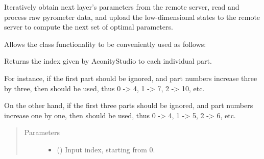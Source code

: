 \documentclass[letterpaper,10pt,english,openany,oneside]{sphinxmanual}
\begin{document}
\begin{fulllineitems}
\begin{fulllineitems}
\end{fulllineitems}


\begin{fulllineitems}
\label{\detokenize{_modules/machine:machine.Machine.log}}
\end{fulllineitems}


\begin{fulllineitems}
\label{\detokenize{_modules/machine:machine.Machine.loop}}
Iteratively obtain next layer’s parameters from the remote server,
read and process raw pyrometer data, and upload the low-dimensional
states to the remote server to compute the next set of optimal parameters.

Allows the class functionality to be conveniently used as follows:

\begin{sphinxVerbatim}[commandchars=\\\{\}]
   
\end{sphinxVerbatim}

\end{fulllineitems}


\begin{fulllineitems}
\label{\detokenize{_modules/machine:machine.Machine.pieceNumber}}
Returns the index given by AconityStudio to each individual part.

For instance, if the first part should be ignored, and part numbers increase
three by three, then  should be used, thus
0 -\textgreater{} 4, 1 -\textgreater{} 7, 2 -\textgreater{} 10, etc.

On the other hand, if the first three parts should be ignored, and part numbers
increase one by one, then  should be used, thus
0 -\textgreater{} 4, 1 -\textgreater{} 5, 2 -\textgreater{} 6, etc.
\begin{quote}\begin{description}
\item[{Parameters}] \leavevmode\begin{itemize}
\item {} 
 () \textendash{} Input index, starting from 0.


\end{itemize}
\end{description}
\end{quote}
\end{fulllineitems}
\end{fulllineitems}
\end{document}
